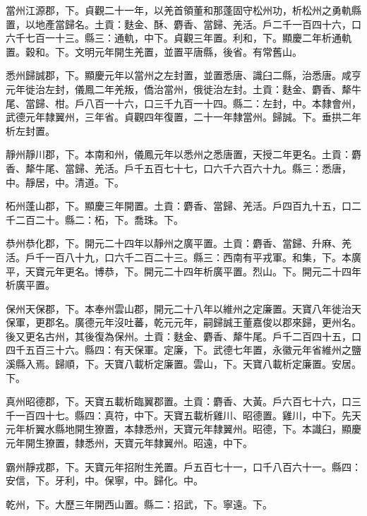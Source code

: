 \begin{pinyinscope}
 當州江源郡，下。貞觀二十一年，以羌首領董和那蓬固守松州功，析松州之勇軌縣置，以地產當歸名。土貢：麩金、酥、麝香、當歸、羌活。戶二千一百四十六，口六千七百一十三。縣三：通軌，中下。貞觀三年置。利和，下。顯慶二年析通軌置。穀和。下。文明元年開生羌置，並置平唐縣，後省。有常舊山。



 悉州歸誠郡，下。顯慶元年以當州之左封置，並置悉唐、識臼二縣，治悉唐。咸亨元年徙治左封，儀鳳二年羌叛，僑治當州，俄徙治左封。土貢：麩金、麝香、犛牛尾、當歸、柑。戶八百一十六，口三千九百一十四。縣二：左封，中。本隸會州，武德元年隸翼州，三年省。貞觀四年復置，二十一年隸當州。歸誠。下。垂拱二年析左封置。



 靜州靜川郡，下。本南和州，儀鳳元年以悉州之悉唐置，天授二年更名。土貢：麝香、犛牛尾、當歸、羌活。戶千五百七十七，口六千六百六十九。縣三：悉唐，中。靜居，中。清道。下。



 柘州蓬山郡，下。顯慶三年開置。土貢：麝香、當歸、羌活。戶四百九十五，口二千二百二十。縣二：柘，下。喬珠。下。



 恭州恭化郡，下。開元二十四年以靜州之廣平置。土貢：麝香、當歸、升麻、羌活。戶千一百八十九，口六千二百二十三。縣三：西南有平戎軍。和集，下。本廣平，天寶元年更名。博恭，下。開元二十四年析廣平置。烈山。下。開元二十四年析廣平置。



 保州天保郡，下。本奉州雲山郡，開元二十八年以維州之定廉置。天寶八年徙治天保軍，更郡名。廣德元年沒吐蕃，乾元元年，嗣歸誠王董嘉俊以郡來歸，更州名。後又更名古州，其後復為保州。土貢：麩金、麝香、犛牛尾。戶千二百四十五，口四千五百三十六。縣四：有天保軍。定廉，下。武德七年置，永徽元年省維州之鹽溪縣入焉。歸順，下。天寶八載析定廉置。雲山，下。天寶八載析定廉置。安居。下。



 真州昭德郡，下。天寶五載析臨翼郡置。土貢：麝香、大黃。戶六百七十六，口三千一百四十七。縣四：真符，中下。天寶五載析雞川、昭德置。雞川，中下。先天元年析翼水縣地開生獠置，本隸悉州，天寶元年隸翼州。昭德，下。本識臼，顯慶元年開生獠置，隸悉州，天寶元年隸翼州。昭遠，中下。



 霸州靜戎郡，下。天寶元年招附生羌置。戶五百七十一，口千八百六十一。縣四：安信，下。牙利，中。保寧，中。歸化。中。



 乾州，下。大歷三年開西山置。縣二：招武，下。寧遠。下。




\end{pinyinscope}
